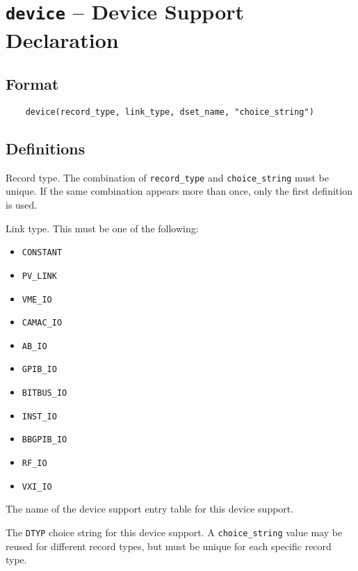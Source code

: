 \section{\texttt{device} -- Device Support Declaration}

\subsection{Format}

\begin{verbatim}
    device(record_type, link_type, dset_name, "choice_string")
\end{verbatim}

\subsection{Definitions}

\begin{description}
\item [record\_type] Record type.
The combination of \verb|record_type| and \verb|choice_string| must be unique.
If the same combination appears more than once, only the first definition is used.

\item [link\_type] Link type. This must be one of the following:

\begin{itemize}
\item \verb|CONSTANT|
\item \verb|PV_LINK|
\item \verb|VME_IO|
\item \verb|CAMAC_IO|
\item \verb|AB_IO|
\item \verb|GPIB_IO|
\item \verb|BITBUS_IO|
\item \verb|INST_IO|
\item \verb|BBGPIB_IO|
\item \verb|RF_IO|
\item \verb|VXI_IO|
\end{itemize}

\item [dset\_name] The name of the device support entry table for this device support.

\item [choice\_string] The \verb|DTYP| choice string for this device support.
A \verb|choice_string| value may be reused for different record types, but must be unique for each specific record type.
\end{description}

